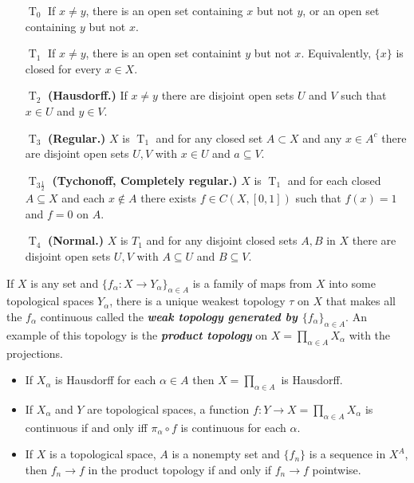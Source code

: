 \documentclass{article}
\theoremstyle{definition}
\begin{document}
	\begin{enumerate}
		\item[$\operatorname{T}_0$] If $x\neq y$, there is an open set containing $x$ but not $y$, or an open set containing $y$ but not $x$.
		\item[$\operatorname{T}_1$] If $x\neq y$, there is an open set containint $y$ but not $x$. Equivalently, $\{x\}$ is closed for every $x\in X$.
		\item[$\operatorname{T}_2$] \textbf{(Hausdorff.)} If $x\neq y$ there are disjoint open sets $U$ and $V$ such that $x\in U$ and $y\in V$.
		\item[$\operatorname{T}_3$] \textbf{(Regular.)} $X$ is $\operatorname{T}_1$ and for any closed set $A\subset X$ and any $x\in A^c$ there are disjoint open sets $U,V$ with $x\in U$ and $a\subseteq V$.
		\item[$\operatorname{T}_{3\frac{1}{2}}$] \textbf{(Tychonoff, Completely regular.)} $X$ is $\operatorname{T}_1$ and for each closed $A\subseteq X$ and each $x\notin A$ there exists $f\in C(X,[0,1])$ such that $f(x)=1$ and $f=0$ on $A$.
		\item[$\operatorname{T}_4$] \textbf{(Normal.)} $X$ is $T_1$ and for any disjoint closed sets $A,B$ in $X$ there are disjoint open sets $U,V$ with $A\subseteq U$ and $B\subseteq V$.
	\end{enumerate}
	
	If $X$ is any set and $\{f_\alpha:X\to Y_\alpha\}_{\alpha\in A}$ is a family of maps from $X$ into some topological spaces $Y_\alpha$, there is a unique weakest topology $\tau$ on $X$ that makes all the $f_\alpha$ continuous called the \textbf{\textit{weak topology generated by $\{f_\alpha\}_{\alpha\in A}$}}. An example of this topology is the \textbf{\textit{product topology}} on $X=\prod_{\alpha\in A}X_\alpha$ with the projections.
	
	\begin{prop}\leavevmode
		\begin{itemize}
			\item If $X_\alpha$ is Hausdorff for each $\alpha\in A$ then $X=\prod_{\alpha\in A}$ is Hausdorff.
			\item If $X_\alpha$ and $Y$ are topological spaces, a function $f:Y\to X=\prod_{\alpha\in A}X_\alpha$ is continuous if and only iff $\pi_\alpha\circ f$ is continuous for each $\alpha$.
			\item If $X$ is a topological space, $A$ is a nonempty set and $\{f_n\}$ is a sequence in $X^A$, then $f_n\to f$ in the product topology if and only if $f_n\to f$ pointwise.
		\end{itemize}
	\end{prop}
	
\end{document}
